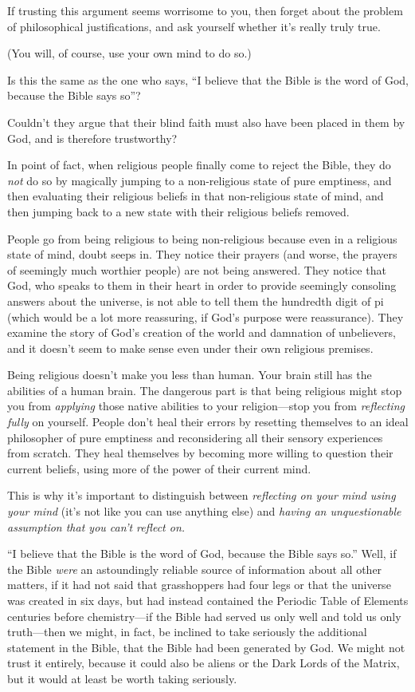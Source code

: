  If trusting this argument seems worrisome to you, then forget
about the problem of philosophical justifications, and ask yourself
whether it's really truly true.


 (You will, of course, use your own mind to do so.)


 Is this the same as the one who says, ``I believe
that the Bible is the word of God, because the Bible says
so''?


 Couldn't they argue that their blind faith must
also have been placed in them by God, and is therefore trustworthy?


 In point of fact, when religious people finally come to reject the
Bible, they do \textit{not} do so by magically jumping to a
non-religious state of pure emptiness, and then evaluating their
religious beliefs in that non-religious state of mind, and then jumping
back to a new state with their religious beliefs removed.


 People go from being religious to being non-religious because even
in a religious state of mind, doubt seeps in. They notice their prayers
(and worse, the prayers of seemingly much worthier people) are not
being answered. They notice that God, who speaks to them in their heart
in order to provide seemingly consoling answers about the universe, is
not able to tell them the hundredth digit of pi (which would be a lot
more reassuring, if God's purpose were reassurance).
They examine the story of God's creation of the world
and damnation of unbelievers, and it doesn't seem to
make sense even under their own religious premises.


 Being religious doesn't make you less than human.
Your brain still has the abilities of a human brain. The dangerous part
is that being religious might stop you from \textit{applying} those
native abilities to your religion---stop you from \textit{reflecting
fully} on yourself. People don't heal their errors by
resetting themselves to an ideal philosopher of pure emptiness and
reconsidering all their sensory experiences from scratch. They heal
themselves by becoming more willing to question their current beliefs,
using more of the power of their current mind.

{
 This is why it's important to distinguish between
\textit{reflecting on your mind using your mind} (it's
not like you can use anything else) and \textit{having an
unquestionable assumption that you can't reflect on.}}


 ``I believe that the Bible is the word of God,
because the Bible says so.'' Well, if the Bible
\textit{were} an astoundingly reliable source of information about all
other matters, if it had not said that grasshoppers had four legs or
that the universe was created in six days, but had instead contained
the Periodic Table of Elements centuries before chemistry---if the
Bible had served us only well and told us only truth---then we might,
in fact, be inclined to take seriously the additional statement in the
Bible, that the Bible had been generated by God. We might not trust it
entirely, because it could also be aliens or the Dark Lords of the
Matrix, but it would at least be worth taking seriously.


